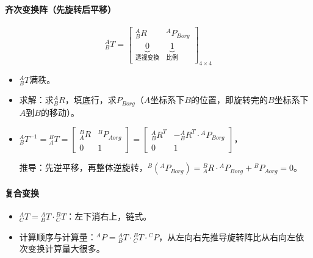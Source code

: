 \documentclass[
12pt, %
a4paper, 
oneside, %
headinclude,footinclude, %
]{scrartcl}
\begin{document}
\paragraph{齐次变换阵（先旋转后平移）}
$$ {}^A_B T = \begin{bmatrix} {}^A_B R & {}^A P_{Borg} \\ \underbrace{0}_{\text{透视变换}} & \underbrace{1}_{\text{比例}} \end{bmatrix}_{4 \times 4} $$
\begin{itemize}
\item $ {}^A_B T $满秩。
\item 求解：求$ {}^A_B R $，填底行，求$ P_{Borg} $（$ A $坐标系下$ B $的位置，即旋转完的$ B $坐标系下$ A $到$ B $的移动）。
\item 
$ 
{}^A_B T^{-1} = {}^B_A T 
= \begin{bmatrix} {}^B_A R & {}^B P_{Aorg} \\ 0 & 1 \end{bmatrix} 
= \begin{bmatrix} {}^A_B R^T & -{}^A_B R^T \cdot {}^A P_{Borg} \\ 0 & 1 \end{bmatrix} 
$，

推导：先逆平移，再整体逆旋转，$ {}^B({}^A P_{Borg}) = {}^B_A R \cdot {}^A P_{Borg} + {}^B P_{Aorg} = 0 $。
\end{itemize}
\paragraph{复合变换}
\begin{itemize}
\item $ {}^A_C T = {}^A_B T \cdot {}^B_C T $：左下消右上，链式。
\item 计算顺序与计算量：$ {}^A P = {}^A_B T \cdot {}^B_C T \cdot {}^C P $，从左向右先推导旋转阵比从右向左依次变换计算量大很多。
\end{itemize}
\end{document}
